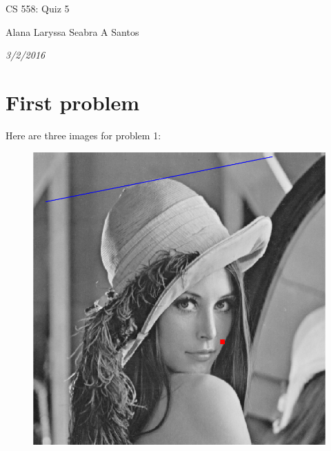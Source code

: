 \documentclass{article}
\begin{document}
\centerline{\sc \large CS 558: Quiz 5}
\vspace{.5pc}
\centerline{Alana Laryssa Seabra A Santos}
\centerline{\it 3/2/2016}
\vspace{1pc}

\section{First problem}

Here are three images for problem 1:

\begin{figure}[h]
\centering
  \includegraphics[scale=0.45]{../prob1.png}
\end{figure}
\end{document}
